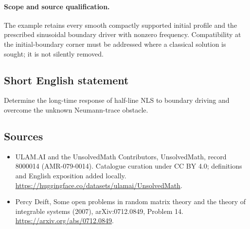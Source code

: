 \documentclass[11pt]{article}
\begin{document}
\paragraph{Scope and source qualification.}The example retains every smooth compactly supported initial profile and the prescribed sinusoidal boundary driver with nonzero frequency. Compatibility at the initial-boundary corner must be addressed where a classical solution is sought; it is not silently removed.
\subsection{Short English statement}
Determine the long-time response of half-line NLS to boundary driving and overcome the unknown Neumann-trace obstacle.
\subsection{Sources}
\begin{itemize}
\item[\hypertarget{source:8000014:1}{S1}] ULAM.AI and the UnsolvedMath Contributors, UnsolvedMath, record 8000014 (AMR-079-0014). Catalogue curation under CC BY 4.0; definitions and English exposition added locally.
\url{https://huggingface.co/datasets/ulamai/UnsolvedMath}.
\item[\hypertarget{source:8000014:2}{S2}] Percy Deift, Some open problems in random matrix theory and the theory of integrable systems (2007), arXiv:0712.0849, Problem 14.
\url{https://arxiv.org/abs/0712.0849}.
\end{itemize}
\label{end:8000014}
\end{document}
